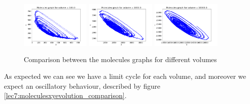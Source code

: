 \begin{figure}[H]
    \centering
    \includegraphics[width=0.3\textwidth]{FIG/exercise_7_images/gillespiexy_volume100.0.png} \hspace{0.5cm}
    \includegraphics[width=0.3\textwidth]{FIG/exercise_7_images/gillespiexy_volume1000.0.png} \hspace{0.5cm}
    \includegraphics[width=0.3\textwidth]{FIG/exercise_7_images/gillespiexy_volume10000.0.png}
    \caption{Comparison between the molecules graphs for different volumes}
    \label{lec7:moleculesxy_comparison}
\end{figure}

As expected we can see we have a limit cycle for each volume, and moreover we expect an oscillatory behaviour, described by figure \ref{lec7:moleculesxyevolution_comparison}.

